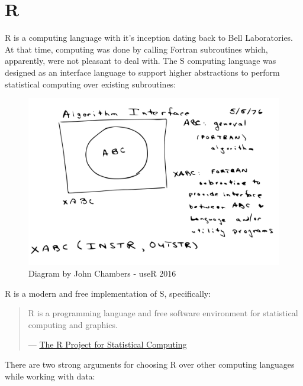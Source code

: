 \documentclass[]{book}
\theoremstyle{definition}
\theoremstyle{definition}
\theoremstyle{definition}
\theoremstyle{remark}
\begin{document}
\section{R}\label{r}

R is a computing language with it's inception dating back to Bell
Laboratories. At that time, computing was done by calling Fortran
subroutines which, apparently, were not pleasant to deal with. The S
computing language was designed as an interface language to support
higher abstractions to perform statistical computing over existing
subroutines:

\begin{figure}
\centering
\includegraphics{images/01-intro-s-algorithm-interface.png}
\caption{Diagram by John Chambers - useR 2016}
\end{figure}

R is a modern and free implementation of S, specifically:

\begin{quote}
R is a programming language and free software environment for
statistical computing and graphics.

--- \href{https://www.r-project.org/}{The R Project for Statistical
Computing}
\end{quote}

There are two strong arguments for choosing R over other computing
languages while working with data:
\end{document}
